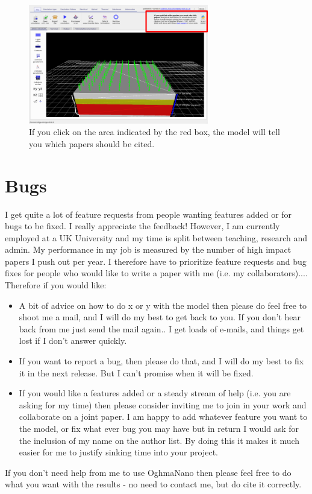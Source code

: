 \begin{figure}
\centering
\includegraphics[width=0.7\textwidth]{./images/cite_me2.png}
\caption{If you click on the area indicated by the red box, the model will tell you which papers should be cited.}
\label{fig:cite_me}
\end{figure}

\section{Bugs}
I get quite a lot of feature requests from people wanting features added or for bugs to be fixed. I really appreciate the feedback!  However, I am currently employed at a UK University and my time is split between teaching, research and admin. My performance in my job is measured by the number of high impact papers I push out per year. I therefore have to prioritize feature requests and bug fixes for people who would like to write a paper with me (i.e. my collaborators).... Therefore if you would like:

\begin{itemize}
  \item A bit of advice on how to do x or y with the model then please do feel free to shoot me a mail, and I will do my best to get back to you. If you don't hear back from me just send the mail again.. I get loads of e-mails, and things get lost if I don't answer quickly.
  \item If you want to report a bug, then please do that, and I will do my best to fix it in the next release. But I can't promise when it will be fixed.
  \item  If you would like a features added or a steady stream of help (i.e. you are asking for my time) then please consider inviting me to join in your work and collaborate on a joint paper. I am happy to add whatever feature you want to the model, or fix what ever bug you may have but in return I would ask for the inclusion of my name on the author list. By doing this it makes it much easier for me to justify sinking time into your project.
\end{itemize}
    
If you don't need help from me to use OghmaNano then please feel free to do what you want with the results - no need to contact me, but do cite it correctly.



